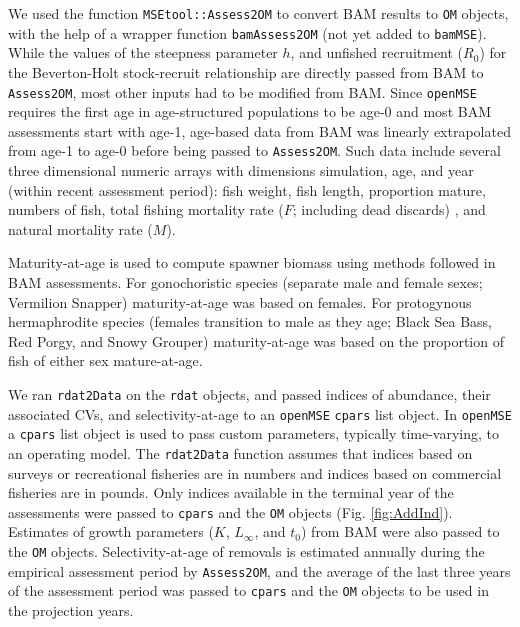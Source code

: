 \documentclass[12pt,english]{article}
\begin{document}
\begin{flushleft}
\begin{spacing}{1.9}
We used the function \texttt{MSEtool::Assess2OM} to convert BAM results to \texttt{OM} objects, with the help of a wrapper function \texttt{bamAssess2OM} (not yet added to \texttt{bamMSE}). While the values of the steepness parameter $h$, and unfished recruitment ($R_{0}$) for the Beverton-Holt stock-recruit relationship are directly passed from BAM to \texttt{Assess2OM}, most other inputs had to be modified from BAM. Since \texttt{openMSE} requires the first age in age-structured populations to be age-0 and most BAM assessments start with age-1, age-based data from BAM was linearly extrapolated from age-1 to age-0 before being passed to \texttt{Assess2OM}. Such data include several three dimensional numeric arrays with dimensions simulation, age, and year (within recent assessment period): fish weight, fish length, proportion mature, numbers of fish, total fishing mortality rate ($F$; including dead discards) , and natural mortality rate ($M$).

Maturity-at-age is used to compute spawner biomass using methods followed in BAM assessments. For gonochoristic species (separate male and female sexes; Vermilion Snapper) maturity-at-age was based on females. For protogynous hermaphrodite species (females transition to male as they age; Black Sea Bass, Red Porgy, and Snowy Grouper) maturity-at-age was based on the proportion of fish of either sex mature-at-age.

We ran  \texttt{rdat2Data} on the \texttt{rdat} objects, and passed indices of abundance, their associated CVs, and selectivity-at-age to an \texttt{openMSE} \texttt{cpars} list object. In \texttt{openMSE} a \texttt{cpars} list object is used to pass custom parameters, typically time-varying, to an operating model. The \texttt{rdat2Data} function assumes that indices based on surveys or recreational fisheries are in numbers and indices based on commercial fisheries are in pounds. Only indices available in the terminal year of the assessments were passed to \texttt{cpars} and the \texttt{OM} objects (Fig. \ref{fig:AddInd}). Estimates of growth parameters ($K$, $L_{\infty}$, and $t_{0}$) from BAM were also passed to the \texttt{OM} objects. Selectivity-at-age of removals is estimated annually during the empirical assessment period by \texttt{Assess2OM}, and the average of the last three years of the assessment period was passed to \texttt{cpars} and the \texttt{OM} objects to be used in the projection years.


\end{spacing}
\end{flushleft}
\end{document}
